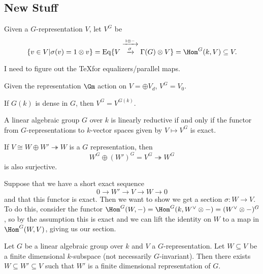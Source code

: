 \documentclass[12pt]{article}
\begin{document}
\subsection{New Stuff}
Given a $G$-representation $V$, let $V^G$ be 
\[\{v\in V|\sigma(v)=1\otimes v\}=\operatorname{Eq}\{V\stackrel{\xrightarrow{1\otimes -}}{\xrightarrow{\sigma}}\Gamma(G)\otimes V\}=\Hom^G(k,V)\subseteq V.\]
\begin{rmk}
	I need to figure out the \TeX for equalizers/parallel maps.
\end{rmk}
\begin{ex}
	Given the representation $\Gm$ action on $V=\oplus V_d$, $V^G=V_0$.
\end{ex}
\begin{prob}
	If $G(k)$ is dense in $G$, then $V^G=V^{G(k)}$.
\end{prob}
\begin{prop}
	A linear algebraic group $G$ over $k$ is linearly reductive if and only if the functor from $G$-representations to 
	$k$-vector spaces given by $V\mapsto V^G$ is exact.
\end{prop}
\begin{prf}
	If $V\cong W\oplus W'\twoheadrightarrow W$ is a $G$ representation, then 
	\[W^G\oplus(W')^G=V^G\twoheadrightarrow W^G\]
	is also surjective.

	Suppose that we have a short exact sequence 
	\[0\to W'\to V\to W\to 0\]
	and that this functor is exact. Then we want to show we get a section $\sigma:W\to V$. To do this, consider the functor 
	$\Hom^G(W,-)=\Hom^G(k,W^\vee\otimes -)=(W^\vee\otimes -)^G$, so by the assumption this is exact and we can lift the identity on $W$ 
	to a map in $\Hom^G(W,V)$, giving us our section.
\end{prf}
\begin{prop}
	Let $G$ be a linear algebraic group over $k$ and $V$ a $G$-representation. Let $W\subseteq V$ be a finite dimensional $k$-subspace (not 
	necessarily $G$-invariant). Then there exists $W\subseteq W'\subseteq V$ such that $W'$ is a finite dimensional representation of $G$.
\end{prop}
\end{document}
